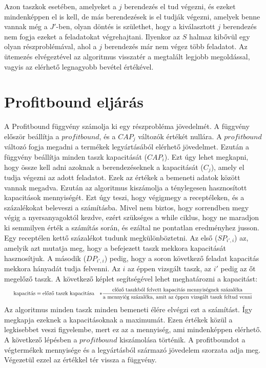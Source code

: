 \newpage
Azon taszkok esetében, amelyeket a $j$ berendezés el tud végezni, és ezeket mindenképpen el is kell, de más berendezések is el tudják végezni, amelyek benne vannak még a $J'$-ben, olyan döntés is születhet, hogy a kiválasztott $j$ berendezés nem fogja ezeket a feladatokat végrehajtani. Ilyenkor az $S$ halmaz kibővül egy olyan részproblémával, ahol a $j$ berendezés már nem végez több feladatot. Az ütemezés elvégeztével az algoritmus visszatér a megtalált legjobb megoldással, vagyis az elérhető legnagyobb bevétel értékével.

\section{Profitbound eljárás}
A Profitbound függvény számolja ki egy részprobléma jövedelmét. A függvény először beállítja a $profitbound$, és a $CAP_{j}$ változók értékét nullára. A $profitbound$ változó fogja megadni a termékek legyártásából elérhető jövedelmet. Ezután a függvény beállítja minden taszk kapacitását ($CAP_{i}$). Ezt úgy lehet megkapni, hogy össze kell adni azoknak a berendezéseknek a kapacitását ($C_{j}$), amely el tudja végezni az adott feladatot. Ezek az értékek a bemeneti adatok között vannak megadva. Ezután az algoritmus kiszámolja a ténylegesen hasznosított kapacitások mennyiségét. Ezt úgy teszi, hogy végigmegy a receptéleken, és a százalékokat beleveszi a számításba. Mivel nem biztos, hogy sorrendben megy végig a nyersanyagoktól kezdve, ezért szükséges a while ciklus, hogy ne maradjon ki semmilyen érték a számítás során, és ezáltal ne pontatlan eredményhez jusson. Egy receptélen kettő százalékot tudunk megkülönböztetni. Az első ($SP_{i',i}$) az, amelyik azt mutatja meg, hogy a befejezett taszk mekkora kapacitását hasznosítjuk. A második ($DP_{i',i}$) pedig, hogy a soron következő feladat kapacitás mekkora hányadát tudja felvenni. Az $i$ az éppen vizsgált taszk, az $i'$ pedig az őt megelőző taszk. A következő képlet segítségével lehet meghatározni a kapacitást:
\begin{gather}
\scalebox{0.75}{$
\begin{align*}
\text{kapacitás}&= \text{előző taszk kapacitása}&*\frac{\text{előző taszkból felvett kapacitás mennyiségnek százaléka}}{\text{a mennyiég százaléka, amit az éppen vizsgált taszk feltud venni}}
\end{align*}$}	
\end{gather}
Az algoritmus minden taszk minden bemeneti élére elvégzi ezt a számítást. Így megkapja ezeknek a kapacitásoknak a maximumát. Ezen értékek közül a legkisebbet veszi figyelembe, mert ez az a mennyiség, ami mindenképpen elérhető. A következő lépésben a $profitbound$ kiszámolása történik. A profitboundot a végtermékek mennyisége és a legyártásból származó jövedelem szorzata adja meg. Végezetül ezzel az értékkel tér vissza a függvény.

